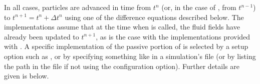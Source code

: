In all cases, particles are advanced in time from $t^n$ (or, in the
case of , from $t^{n-1}$) to $t^{n+1} = t^n + \Delta
t^n$ using one of the difference equations described below. The
implementations assume that at the time when
 is called, the fluid fields have
already been updated to $t^{n+1}$, as is the case with the
 implementations provided with
\flashx. A specific implementation of the passive portion of
 is selected by a setup option such
as , or by
specifying something like  in a simulation's
 file (or by listing the path in the  file if
not using the  configuration option).  
Further details are given is  below.



